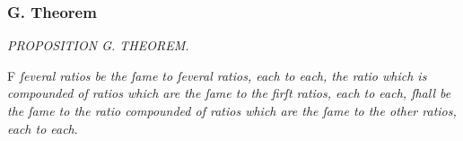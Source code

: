 \documentclass[11pt,preview]{standalone}
\begin{document}
\null\removelastskip\nointerlineskip\vspace*{-\baselineskip}

\newcommand{\blueA}{{\color{cblue}{A}}}
\newcommand{\blueB}{{\color{cblue}{B}}}
\newcommand{\blueC}{{\color{cblue}{C}}}
\newcommand{\blueD}{{\color{cblue}{D}}}
\newcommand{\blueE}{{\color{cblue}{E}}}
\newcommand{\blueF}{{\color{cblue}{F}}}
\newcommand{\blueG}{{\color{cblue}{G}}}
\newcommand{\blueH}{{\color{cblue}{H}}}

\newcommand{\redP}{{\color{cred}{P}}}
\newcommand{\redQ}{{\color{cred}{Q}}}
\newcommand{\redR}{{\color{cred}{R}}}
\newcommand{\redS}{{\color{cred}{S}}}
\newcommand{\redT}{{\color{cred}{T}}}

\newcommand{\yellowV}{{\color{cyellow}{V}}}
\newcommand{\yellowW}{{\color{cyellow}{W}}}
\newcommand{\yellowX}{{\color{cyellow}{X}}}
\newcommand{\yellowY}{{\color{cyellow}{Y}}}
\newcommand{\yellowZ}{{\color{cyellow}{Z}}}

\subsubsection{G. Theorem}

\begin{minipage}{\textwidth}
    \begin{center}
        \textit{PROPOSITION G. THEOREM.}\label{book5prG} \\
    \end{center}

    \hfill

    \begin{center}
        \raggedright \lettrine[lines=3, loversize=1, nindent=0pt]{}{}F \textit{ſeveral ratios be the ſame to ſeveral ratios, each to each, the ratio which is compounded of ratios which are the ſame to the firſt ratios, each to each, ſhall be the ſame to the ratio compounded of ratios which are the ſame to the other ratios, each to each}.
    \end{center}
\end{minipage}

\begin{center}
    \minibox[frame]{\blueA\ \ \blueB\ \ \blueC\ \ \blueD\ \ \blueE\ \ \blueF\ \ \blueG\ \ \blueH \qquad \qquad \qquad \qquad \redP\ \ \redQ\ \ \redR\ \ \redS\ \ \redT\ \\ \textit{a}\ \, \textit{b}\, \, \textit{c}\, \, \textit{d}\, \ \textit{e}\, \ \textit{f}\, \ \textit{g}\, \ \textit{h} \qquad \qquad \qquad \qquad \yellowV\, \yellowW\,  \yellowX\,  \yellowY\,  \yellowZ}
\end{center}
\end{document}
